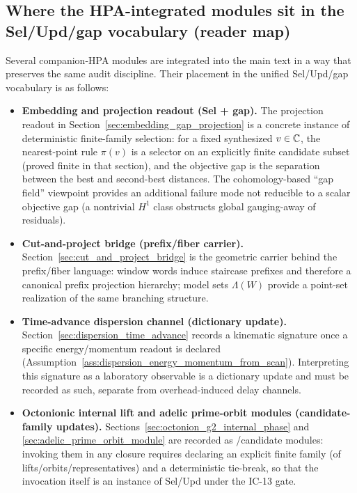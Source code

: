 \subsection*{Where the HPA-integrated modules sit in the Sel/Upd/gap vocabulary (reader map)}
\label{subsec:sel_upd_gap_hpa_map}
\AuditTag Several companion-HPA modules are integrated into the main text in a way that preserves the same audit discipline.
Their placement in the unified Sel/Upd/gap vocabulary is as follows:
\begin{itemize}
\item \textbf{Embedding and projection readout (Sel + gap).}
The projection readout in Section~\ref{sec:embedding_gap_projection} is a concrete instance of deterministic finite-family selection:
for a fixed synthesized $v\in\mathbb{C}$, the nearest-point rule $\pi(v)$ is a selector on an explicitly finite candidate subset (proved finite in that section), and the objective gap is the separation between the best and second-best distances.
The cohomology-based ``gap field'' viewpoint provides an additional \AuditTag failure mode not reducible to a scalar objective gap (a nontrivial $H^1$ class obstructs global gauging-away of residuals).
\item \textbf{Cut-and-project bridge (prefix/fiber carrier).}
Section~\ref{sec:cut_and_project_bridge} is the geometric carrier behind the prefix/fiber language:
window words induce staircase prefixes and therefore a canonical prefix projection hierarchy; model sets $\Lambda(W)$ provide a point-set realization of the same branching structure.
\item \textbf{Time-advance dispersion channel (dictionary update).}
Section~\ref{sec:dispersion_time_advance} records a kinematic signature once a specific energy/momentum readout is declared (Assumption~\ref{ass:dispersion_energy_momentum_from_scan}).
Interpreting this signature as a laboratory observable is a \MatchTag dictionary update and must be recorded as such, separate from overhead-induced delay channels.
\item \textbf{Octonionic internal lift and adelic prime-orbit modules (candidate-family updates).}
Sections~\ref{sec:octonion_g2_internal_phase} and \ref{sec:adelic_prime_orbit_module} are recorded as \AuditTag/\InterfaceTag candidate modules:
invoking them in any closure requires declaring an explicit finite family (of lifts/orbits/representatives) and a deterministic tie-break, so that the invocation itself is an instance of Sel/Upd under the IC-13 gate.
\end{itemize}

